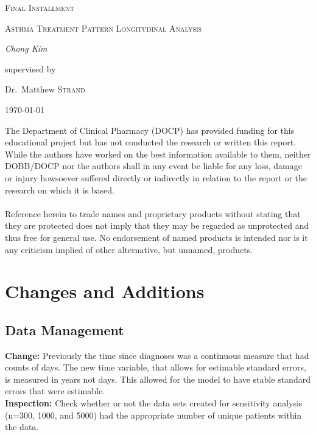 \documentclass[10pt,a4paper,fleqn]{article}
\author{Chong Kim}
\begin{document}
\begin{titlepage}
\date{}
	\centering

	{\scshape\LARGE Final Installment \par}
	\vspace{1cm}
	{\scshape\Large Asthma Treatment Pattern Longitudinal Analysis \par}
	\vspace{1.5cm}

	\vspace{2cm}
	{\Large\itshape Chong Kim\par}
	\vfill
	supervised by\par
	Dr.~Matthew \textsc{Strand}
	\vfill


	{\large \today\par}

\begin{flushleft}
The Department of Clinical Pharmacy (DOCP) has provided funding for this educational project but has not conducted the
research or written this report. While the authors have worked on the best information available to them, neither
DOBB/DOCP nor the authors shall in any event be liable for any loss, damage or injury howsoever suffered directly or
indirectly in relation to the report or the research on which it is based.
\\~\\
Reference herein to trade names and proprietary products without stating that they are protected does not imply
that they may be regarded as unprotected and thus free for general use. No endorsement of named products is
intended nor is it any criticism implied of other alternative, but unnamed, products.
\end{flushleft}

\end{titlepage}

\newpage
\tableofcontents
{}
\begin{appendix}
  \listoffigures
  \listoftables

\end{appendix}



\newpage 
\section{Changes and Additions}
\subsection{Data Management}
\textbf{Change:} Previously the time since diagnoses was a continuous measure that had counts of days. The new time variable, that allows for estimable standard errors, is measured in years not days. This allowed for the model to have stable standard errors that were estimable.\\
\textbf{Inspection:} Check whether or not the data sets created for sensitivity analysis (n=300, 1000, and 5000) had the appropriate number of unique patients within the data.
\end{document}
